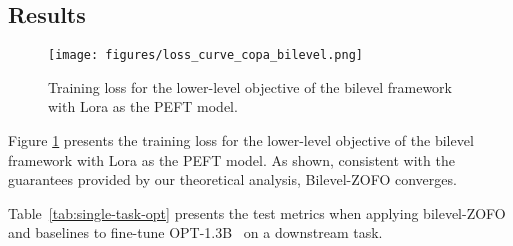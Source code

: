 \subsection{Results}\label{app:appendix-results}

\begin{figure}
    \centering
    \texttt{[image: figures/loss\_curve\_copa\_bilevel.png]}
    \caption{Training loss for the lower-level objective of the bilevel framework with Lora as the PEFT model.}
    \label{fig:loss_curve}
\end{figure}

{ Figure \ref{fig:loss_curve} presents the training loss for the lower-level objective of the bilevel framework with Lora as the PEFT model. As shown, consistent with the guarantees provided by our theoretical analysis, Bilevel-ZOFO converges. }


Table~\ref{tab:single-task-opt} presents the test metrics when applying bilevel-ZOFO and baselines to fine-tune OPT-1.3B~\citep{OPT} on a downstream task. 


